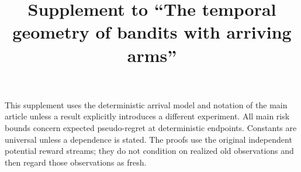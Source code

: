 \documentclass[11pt]{article}
\title{Supplement to ``The temporal geometry of bandits with arriving arms''}
\author{}
\date{}
\begin{document}
\maketitle
This supplement uses the deterministic arrival model and notation of the main article unless a result explicitly introduces a different experiment. All main risk bounds concern expected pseudo-regret at deterministic endpoints. Constants are universal unless a dependence is stated. The proofs use the original independent potential reward streams; they do not condition on realized old observations and then regard those observations as fresh.
\tableofcontents







\end{document}
